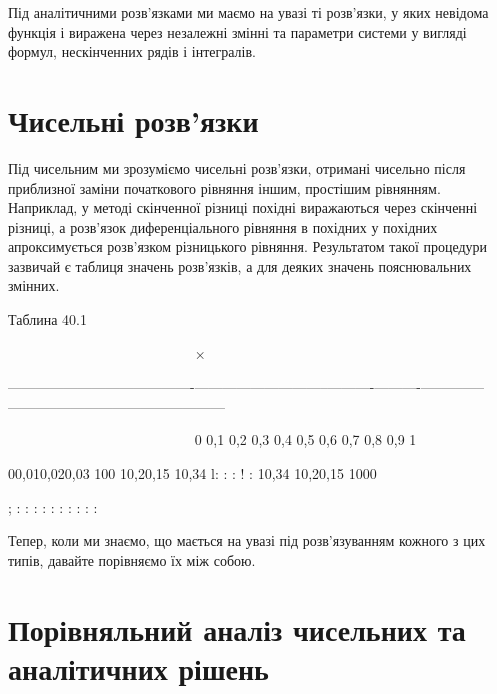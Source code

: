 \documentclass[
  ukrainian,
]{article}
\begin{document}
Під аналітичними розв'язками ми маємо на увазі ті розв'язки, у яких
невідома функція і виражена через незалежні змінні та параметри системи
у вигляді формул, нескінченних рядів і інтегралів.

\section{Чисельні
розв'язки}\label{ux447ux438ux441ux435ux43bux44cux43dux456-ux440ux43eux437ux432ux44fux437ux43aux438}

Під чисельним ми зрозуміємо чисельні розв'язки, отримані чисельно після
приблизної заміни початкового рівняння іншим, простішим рівнянням.
Наприклад, у методі скінченної різниці похідні виражаються через
скінченні різниці, а розв'язок диференціального рівняння в похідних у
похідних апроксимується розв'язком різницького рівняння. Результатом
такої процедури зазвичай є таблиця значень розв'язків, а для деяких
значень пояснювальних змінних.

Таблина 40.1

~~~~~~~~~~~~~~~~~~~~~~~~~~\textbar{} × \textbar{} \textbar{} \textbar{}
\textbar{} \textbar{} \textbar{} \textbar{} \textbar{} \textbar{}
\textbar{} \textbar{}

\textbar---------------------------\textbar-------------\textbar------------------\textbar-----------\textbar----------\textbar----------\textbar-----\textbar-----\textbar-----\textbar-----------\textbar------------------\textbar------------------\textbar{}

~~~~~~~~~~~~~~~~~~~~~~~~~~\textbar{} 0 \textbar{} 0,1 \textbar{} 0,2
\textbar{} 0,3 \textbar{} 0,4 \textbar{} 0,5 \textbar{} 0,6 \textbar{}
0,7 \textbar{} 0,8 \textbar{} 0,9 \textbar{} 1 \textbar{}

00,010,020,03 \textbar{} 100 \textbar{} 10,20,15 \textbar{} 10,34
\textbar{} l: \textbar{} : \textbar{} : \textbar{} ! \textbar{} :
\textbar{} 10,34 \textbar{} 10,20,15 \textbar{} 1000 \textbar{}

; \textbar{} \textbar{} : \textbar{} : \textbar{} : \textbar{} :
\textbar{} : \textbar{} : \textbar{} : \textbar{} : \textbar{} :
\textbar{} : \textbar{}

Тепер, коли ми знаємо, що мається на увазі під розв'язуванням кожного з
цих типів, давайте порівняємо їх між собою.

\section{\texorpdfstring{\textbf{Порівняльний аналіз чисельних} та
аналітичних
рішень}{Порівняльний аналіз чисельних та аналітичних рішень}}\label{ux43fux43eux440ux456ux432ux43dux44fux43bux44cux43dux438ux439-ux430ux43dux430ux43bux456ux437-ux447ux438ux441ux435ux43bux44cux43dux438ux445-ux442ux430-ux430ux43dux430ux43bux456ux442ux438ux447ux43dux438ux445-ux440ux456ux448ux435ux43dux44c}
\end{document}
